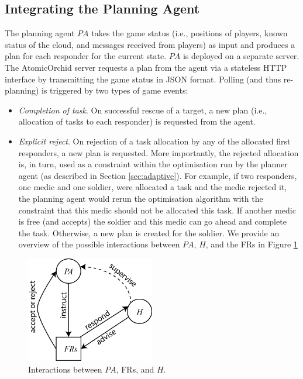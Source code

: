
\subsection{Integrating the Planning Agent}
\noindent The planning agent $PA$ takes the game status (i.e., positions of players, known status of the cloud, and messages received from players) as input and produces a plan for each responder  for the current state. $PA$ is deployed on a separate server. The AtomicOrchid server requests a plan from the agent via a stateless HTTP interface by transmitting the game status in JSON format. Polling (and thus re-planning) is triggered by two types of game events:
\begin{itemize}
\item \textit{Completion of task}. On successful rescue of a target, a new plan (i.e., allocation of tasks to each responder) is requested from the agent.
\item \textit{Explicit reject}. On rejection of a task allocation by any of the allocated first responders, a new plan is requested.  More importantly, the rejected allocation is, in turn, used as a constraint within the optimisation run by the planner agent (as described in Section \ref{sec:adaptive}). For example, if two responders, one medic and one soldier, were allocated a task and the medic rejected it, the planning agent would rerun the optimisation algorithm with the constraint that this medic should not be allocated this task. If another medic is free (and accepts) the soldier and this medic can go ahead and complete the task. Otherwise, a new plan is created for the soldier. We provide an overview of the possible interactions between $PA$, $H$, and the FRs in Figure \ref{fig:arch}
\end{itemize} 
\begin{figure}\centering
\includegraphics[width=0.5\textwidth]{agent-planner.png}
\caption{Interactions between $PA$, FRs, and $H$.}
\label{fig:arch}
\end{figure}

